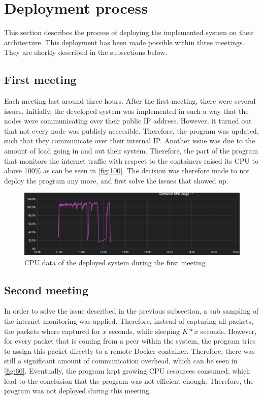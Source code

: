 \section{Deployment process} \label{sec:sb-process}
This section describes the process of deploying the implemented system on their architecture. This deployment has been made possible within three meetings. They are shortly described in the subsections below.

\subsection{First meeting}
Each meeting last around three hours. After the first meeting, there were several issues. Initially, the developed system was implemented in such a way that the nodes were communicating over their public IP address. However, it turned out that not every node was publicly accessible. Therefore, the program was updated, such that they communicate over their internal IP. Another issue was due to the amount of load going in and out their system. Therefore, the part of the program that monitors the internet traffic with respect to the containers raised its CPU to above 100\% as can be seen in \autoref{fig:100}.
The decision was therefore made to not deploy the program any more, and first solve the issues that showed up.

\begin{figure}
    \centering
    \includegraphics[width=\textwidth]{gfx/load-100.png}
    \caption{CPU data of the deployed system during the first meeting}
    \label{fig:100}
\end{figure}

\subsection{Second meeting}
In order to solve the issue described in the previous subsection, a sub sampling of the internet monitoring was applied. Therefore, instead of capturing all packets, the packets where captured for $x$ seconds, while sleeping $K*x$ seconds. However, for every packet that is coming from a peer within the system, the program tries to assign this packet directly to a remote Docker container. Therefore, there was still a significant amount of communication overhead, which can be seen in \autoref{fig:60}. Eventually, the program kept growing CPU resources consumed, which lead to the conclusion that the program was not efficient enough. Therefore, the program was not deployed during this meeting.

